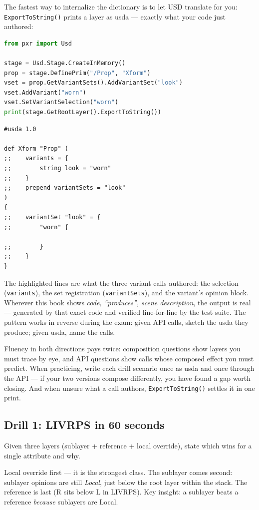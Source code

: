 The fastest way to internalize the dictionary is to let USD translate for
you: \texttt{ExportToString()} prints a layer as usda --- exactly what your
code just authored:

\begin{lstlisting}[language=Python]
from pxr import Usd

stage = Usd.Stage.CreateInMemory()
prop = stage.DefinePrim("/Prop", "Xform")
vset = prop.GetVariantSets().AddVariantSet("look")
vset.AddVariant("worn")
vset.SetVariantSelection("worn")
print(stage.GetRootLayer().ExportToString())
\end{lstlisting}

\produces

\begin{lstlisting}
#usda 1.0

def Xform "Prop" (
;;    variants = {
;;        string look = "worn"
;;    }
;;    prepend variantSets = "look"
)
{
;;    variantSet "look" = {
;;        "worn" {

;;        }
;;    }
}
\end{lstlisting}

\noindent The highlighted lines are what the three variant calls authored:
the selection (\texttt{variants}), the set registration
(\texttt{variantSets}), and the variant's opinion block. Wherever this book
shows \emph{code, ``produces'', scene description}, the output is real ---
generated by that exact code and verified line-for-line by the test suite.
The pattern works in reverse during the exam: given API calls, sketch the
usda they produce; given usda, name the calls.

\begin{ExamTip}
Fluency in both directions pays twice: composition questions show layers you
must trace by eye, and API questions show calls whose composed effect you
must predict. When practicing, write each drill scenario once as usda and
once through the API --- if your two versions compose differently, you have
found a gap worth closing. And when unsure what a call authors,
\texttt{ExportToString()} settles it in one print.
\end{ExamTip}

\DrillsTitle
\subsection*{Drill 1: LIVRPS in 60 seconds}
Given three layers (sublayer + reference + local override), state which wins
for a single attribute and why.
\begin{DrillSolution}
Local override first --- it is the strongest class. The sublayer comes second:
sublayer opinions are still \emph{Local}, just below the root layer within the
stack. The reference is last (R sits below L in LIVRPS). Key insight: a
sublayer beats a reference \emph{because} sublayers are Local.
\end{DrillSolution}

